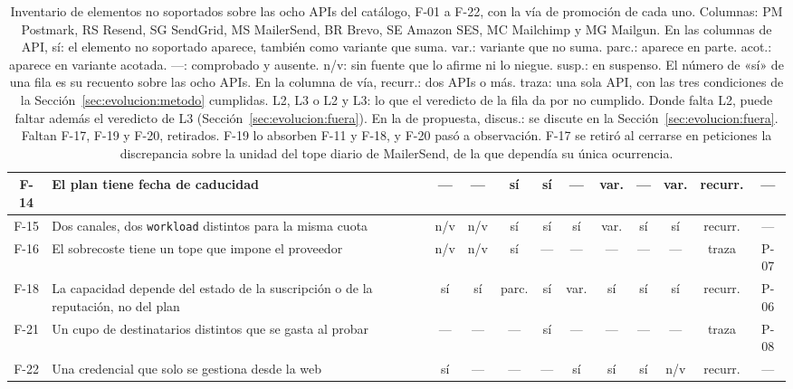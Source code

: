 \begin{table}[H]
\begin{tabular}{|c|p{4.6cm}|c|c|c|c|c|c|c|c|c|c|}
\hline
F-14 & El plan tiene fecha de caducidad & --- & --- & sí & sí & --- & var. & --- & var. & recurr. & --- \\
\hline
F-15 & Dos canales, dos \texttt{workload} distintos para la misma cuota & n/v & n/v & sí & sí & sí & var. & sí & sí & recurr. & --- \\
\hline
F-16 & El sobrecoste tiene un tope que impone el proveedor & n/v & n/v & sí & --- & --- & --- & --- & --- & traza & P-07 \\
\hline
\hline
F-18 & La capacidad depende del estado de la suscripción o de la reputación, no del plan & sí & sí & parc. & sí & var. & sí & sí & sí & recurr. & P-06 \\
\hline
F-21 & Un cupo de destinatarios distintos que se gasta al probar & --- & --- & --- & sí & --- & --- & --- & --- & traza & P-08 \\
\hline
F-22 & Una credencial que solo se gestiona desde la web & sí & --- & --- & --- & sí & sí & sí & n/v & recurr. & --- \\
\hline
\end{tabular}
\caption{Inventario de elementos no soportados sobre las ocho APIs del catálogo, F-01 a F-22, con la vía de promoción de cada uno. Columnas: PM Postmark, RS Resend, SG SendGrid, MS MailerSend, BR Brevo, SE Amazon SES, MC Mailchimp y MG Mailgun. En las columnas de API, sí: el elemento no soportado aparece, también como variante que suma. var.: variante que no suma. parc.: aparece en parte. acot.: aparece en variante acotada. ---: comprobado y ausente. n/v: sin fuente que lo afirme ni lo niegue. susp.: en suspenso. El número de «sí» de una fila es su recuento sobre las ocho APIs. En la columna de vía, recurr.: dos APIs o más. traza: una sola API, con las tres condiciones de la Sección~\ref{sec:evolucion:metodo} cumplidas. L2, L3 o L2 y L3: lo que el veredicto de la fila da por no cumplido. Donde falta L2, puede faltar además el veredicto de L3 (Sección~\ref{sec:evolucion:fuera}). En la de propuesta, discus.: se discute en la Sección~\ref{sec:evolucion:fuera}. Faltan F-17, F-19 y F-20, retirados. F-19 lo absorben F-11 y F-18, y F-20 pasó a observación. F-17 se retiró al cerrarse en peticiones la discrepancia sobre la unidad del tope diario de MailerSend, de la que dependía su única ocurrencia.}
\label{tab:recurrencia}
\end{table}

